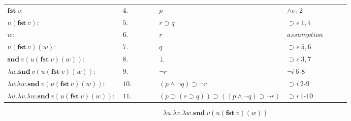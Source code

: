 \documentclass[11pt,a4paper]{article}
\begin{document}
\begin{itemize}
\begin{table}[H]
\begin{tabular}{*{10}{l}}
			$\textbf{fst} \ v:$ & $4.$ & \multicolumn{1}{|c}{} & \multicolumn{1}{|c}{} &  & $p$ & $\land e_1 \ 2$ & & \multicolumn{1}{c|}{} &\multicolumn{1}{c|}{}\\
			
			$u(\textbf{fst} \ v):$ & $5.$ & \multicolumn{1}{|c}{} & \multicolumn{1}{|c}{} &  & $r \supset q$ & $\supset e \ 1, 4$ & & \multicolumn{1}{c|}{} &\multicolumn{1}{c|}{}\\
			
			\cline{5-7}
			
			$w:$ & $6.$ & \multicolumn{1}{|c}{} & \multicolumn{1}{|c}{} & \multicolumn{1}{|c}{} & $r$ & $assumption$ & \multicolumn{1}{|c}{} & \multicolumn{1}{c|}{} &\multicolumn{1}{c|}{}\\
			
			$u(\textbf{fst} \ v)(w):$ & $7.$ & \multicolumn{1}{|c}{} & \multicolumn{1}{|c}{} & \multicolumn{1}{|c}{} & $q$ & $\supset e \ 5, 6$ & \multicolumn{1}{|c}{} & \multicolumn{1}{c|}{} & \multicolumn{1}{c|}{}\\
			
			$\textbf{snd} \ v (u(\textbf{fst} \ v)(w)):$ & $8.$ & \multicolumn{1}{|c}{} & \multicolumn{1}{|c}{} & \multicolumn{1}{|c}{} & $\bot$ & $\supset e \ 3, 7$ & \multicolumn{1}{|c}{} & \multicolumn{1}{c|}{} & \multicolumn{1}{c|}{}\\
			
			\cline{5-7}
			
			$\lambda w . \textbf{snd} \ v (u(\textbf{fst} \ v)(w)):$ & $9.$ & \multicolumn{1}{|c}{} & \multicolumn{1}{|c}{} & & $\neg r$ & $\neg i \ 6$-$8$ & & \multicolumn{1}{c|}{} & \multicolumn{1}{c|}{}\\
			
			\cline{4-9}
			
			$\lambda v . \lambda w . \textbf{snd} \ v (u(\textbf{fst} \ v)(w)):$ & $10.$ & \multicolumn{1}{|c}{} & & & $(p \land \neg q) \supset \neg r$ & $\supset i \ 2$-$9$ & & & \multicolumn{1}{c|}{}\\			
			\cline{3-10}
			
			$\lambda u . \lambda v . \lambda w . \textbf{snd} \ v (u(\textbf{fst} \ v)(w)):$ & $11.$ & & & & $(p \supset (r \supset q)) \supset ((p \wedge \neg q) \supset \neg r)$ & $\supset i \ 1$-$10$ & & & \\
			
		\end{tabular}
		\end{table}
		
		\[ \boxed{\lambda u . \lambda v . \lambda w . \textbf{snd} \ v (u(\textbf{fst} \ v)(w))} \]
		
		
\end{itemize}
\end{document}
